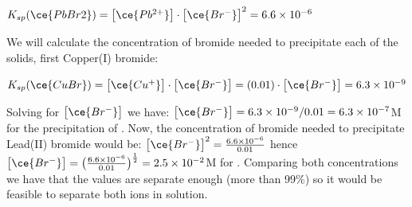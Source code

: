 \documentclass[main.tex]{subfiles}
\begin{document}
\begin{description}
\begin{center}
\hfill $K_{sp}(\ce{PbBr2})= \big[ \ce{Pb^{2+}} \big]\cdot \big[ \ce{Br^{-}} \big]^2=6.6\times 10^{-6}$
\end{center}
We will calculate the concentration of bromide needed to precipitate each of the solids, first Copper(I) bromide:
\begin{center}
$K_{sp}(\ce{CuBr})= \big[ \ce{Cu^{+}} \big]\cdot \big[ \ce{Br^{-}} \big]=(0.01)\cdot\big[ \ce{Br^{-}} \big]=6.3\times 10^{-9}$\\
\end{center}
Solving for $\big[ \ce{Br^{-}} \big]$ we have: $\big[ \ce{Br^{-}} \big]=6.3\times 10^{-9}/0.01=6.3\times 10^{-7}$M for the precipitation of . Now, the concentration of bromide needed to precipitate Lead(II) bromide would be:
$ \big[ \ce{Br^{-}} \big]^2=\frac{6.6\times 10^{-6}}{0.01}$ hence $ \big[ \ce{Br^{-}} \big]=\big(\frac{6.6\times 10^{-6}}{0.01}\big)^{\frac{1}{2}}=2.5\times 10^{-2}$M for . Comparing both concentrations we have that the values are separate enough (more than 99\%) so it would be feasible to separate both ions in solution.
\end{description}
\end{document}
